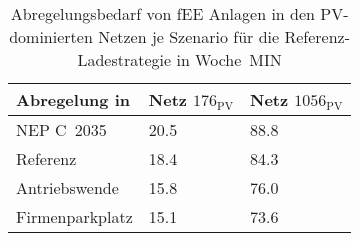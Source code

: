 {
\renewcommand{\arraystretch}{1.2}%
\begin{table}[H]
	\begin{center}
		\caption{Abregelungsbedarf von fEE Anlagen in den PV-dominierten Netzen je Szenario für die Referenz-Ladestrategie in Woche~MIN}
		\begin{tabu} to 0.6\textwidth {X[1.5] X[1, r] X[1, r]}
			\toprule
			Abregelung in   \si{\mwh}    & Netz \(176_{\text{PV}}\) & Netz \(1056_{\text{PV}}\) \\ \midrule
			NEP C~\num{2035}             & \num{20.5}     & \num{88.8}      \\
			Referenz                     & \num{18.4}     & \num{84.3}      \\
			Antriebswende                & \num{15.8}     & \num{76.0}      \\
			\glqq Firmenparkplatz\grqq{} & \num{15.1}     & \num{73.6}      \\ \bottomrule
		\end{tabu}
		\label{tab:pv_dominated_week_a_fee_cur}
	\end{center}
	\vspace{-3mm}%
\end{table}
}